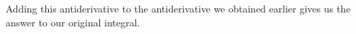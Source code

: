 \documentclass{ximera}
\begin{document}
\begin{exercise}
\begin{exercise}
\begin{exercise}
\begin{exercise}
\begin{exercise}
\begin{exercise}
\begin{exercise}
\begin{exercise}
Adding this antiderivative to the antiderivative we obtained earlier gives us the answer to our original integral. 


\end{exercise}
\end{exercise}

\end{exercise} 

\end{exercise}
\end{exercise}
\end{exercise}
\end{exercise}
\end{exercise}
\end{document}
